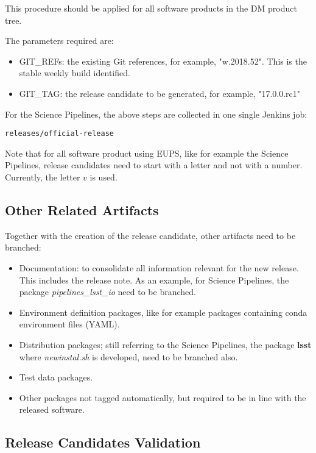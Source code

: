 This procedure should be applied for all software products in the DM product tree.

The parameters required are:
\begin{itemize}
\item GIT\_REFs: the existing Git references, for example, "w.2018.52". This is the stable weekly build identified.
\item GIT\_TAG: the release candidate to be generated, for example, "17.0.0.rc1"
\end{itemize}

For the Science Pipelines, the above steps are collected in one single Jenkins job:

\begin{verbatim}
releases/official-release
\end{verbatim}

Note that for all software product using EUPS, like for example the Science Pipelines, release candidates need to start with a letter and not with a number.
Currently, the letter $v$ is used.


\subsection{Other Related Artifacts}

Together with the creation of the release candidate, other artifacts need to be branched:

\begin{itemize}
\item Documentation: to consolidate all information relevant for the new release. This includes the release note.
As an example, for Science Pipelines, the package \textit{pipelines\_lsst\_io} need to be branched.
\item Environment definition packages, like for example packages containing conda environment files (YAML).
\item Distribution packages; still referring to the Science Pipelines, the package \textbf{lsst}  where \textit{newinstal.sh} is developed, need to be branched also.
\item Test data packages.
\item Other packages not tagged automatically, but required to be in line with the released software.
\end{itemize}


\subsection{Release Candidates Validation} \label{sec:rcvalidation}

